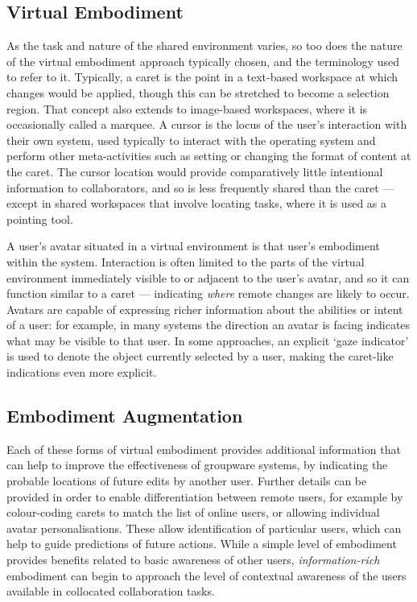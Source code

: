 \documentclass{acm_proc_article-sp}
\begin{document}
\subsection{Virtual Embodiment}
As the task and nature of the shared environment varies, so too does the nature of the virtual embodiment approach typically chosen, and the terminology used to refer to it. Typically, a caret is the point in a text-based workspace at which changes would be applied, though this can be stretched to become a selection region. That concept also extends to image-based workspaces, where it is occasionally called a marquee. A cursor is the locus of the user's interaction with their own system, used typically to interact with the operating system and perform other meta-activities such as setting or changing the format of content at the caret. The cursor location would provide comparatively little intentional information to collaborators, and so is less frequently shared than the caret --- except in shared workspaces that involve locating tasks, where it is used as a pointing tool.

A user's avatar situated in a virtual environment is that user's embodiment within the system. Interaction is often limited to the parts of the virtual environment immediately visible to or adjacent to the user's avatar, and so it can function similar to a caret --- indicating \emph{where} remote changes are likely to occur. Avatars are capable of expressing richer information about the abilities or intent of a user: for example, in many systems the direction an avatar is facing indicates what may be visible to that user. In some approaches, an explicit `gaze indicator' is used to denote the object currently selected by a user, making the caret-like indications even more explicit.

\subsection{Embodiment Augmentation}
Each of these forms of virtual embodiment provides additional information that can help to improve the effectiveness of groupware systems, by indicating the probable locations of future edits by another user. Further details can be provided in order to enable differentiation between remote users, for example by colour-coding carets to match the list of online users, or allowing individual avatar personalisations. These allow identification of particular users, which can help to guide predictions of future actions. While a simple level of embodiment provides benefits related to basic awareness of other users, \emph{information-rich} embodiment can begin to approach the level of contextual awareness of the users available in collocated collaboration tasks.
\end{document}
